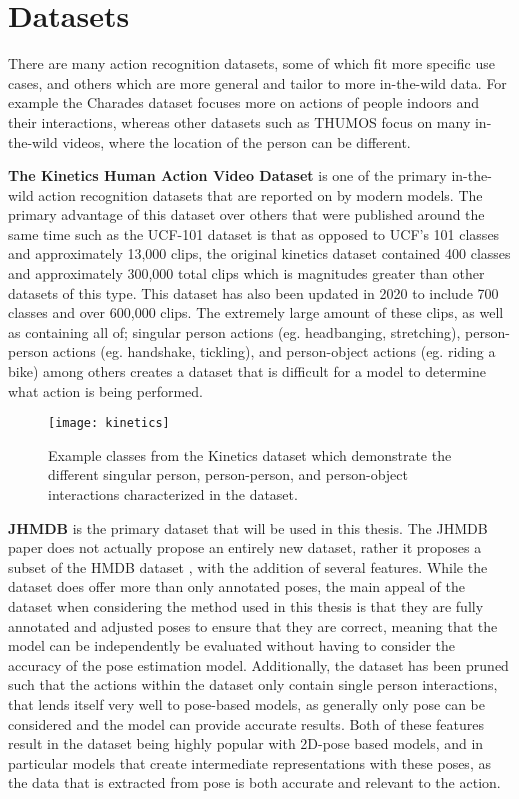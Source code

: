 \section{Datasets}
\label{sec:datasets}

There are many action recognition datasets, some of which fit more specific use cases, and others which are more general and tailor to more in-the-wild data. For example the Charades dataset \cite{charades} focuses more on actions of people indoors and their interactions, whereas other datasets such as THUMOS \cite{THUMOS15} focus on many in-the-wild videos, where the location of the person can be different.

\textbf{The Kinetics Human Action Video Dataset} \cite{kinetics} is one of the primary in-the-wild action recognition datasets that are reported on by modern models. The primary advantage of this dataset over others that were published around the same time such as the UCF-101 dataset \cite{ucf101} is that as opposed to UCF's 101 classes and approximately 13,000 clips, the original kinetics dataset contained 400 classes and approximately 300,000 total clips which is magnitudes greater than other datasets of this type. This dataset has also been updated in 2020 to include 700 classes and over 600,000 clips. The extremely large amount of these clips, as well as containing all of; singular person actions (eg. headbanging, stretching), person-person actions (eg. handshake, tickling), and person-object actions (eg. riding a bike) among others creates a dataset that is difficult for a model to determine what action is being performed.

\begin{figure}[ht]
	\texttt{[image: kinetics]}
	\centering
	\caption{Example classes from the Kinetics dataset \cite{kinetics} which demonstrate the different singular person, person-person, and person-object interactions characterized in the dataset.}
	\label{fig:kinetics}
\end{figure}

\textbf{JHMDB} \cite{JHMDB} is the primary dataset that will be used in this thesis. The JHMDB paper does not actually propose an entirely new dataset, rather it proposes a subset of the HMDB dataset \cite{hmdb}, with the addition of several features. While the dataset does offer more than only annotated poses, the main appeal of the dataset when considering the method used in this thesis is that they are fully annotated and adjusted poses to ensure that they are correct, meaning that the model can be independently be evaluated without having to consider the accuracy of the pose estimation model. Additionally, the dataset has been pruned such that the actions within the dataset only contain single person interactions, that lends itself very well to pose-based models, as generally only pose can be considered and the model can provide accurate results. Both of these features result in the dataset being highly popular with 2D-pose based models, and in particular models that create intermediate representations with these poses, as the data that is extracted from pose is both accurate and relevant to the action.

